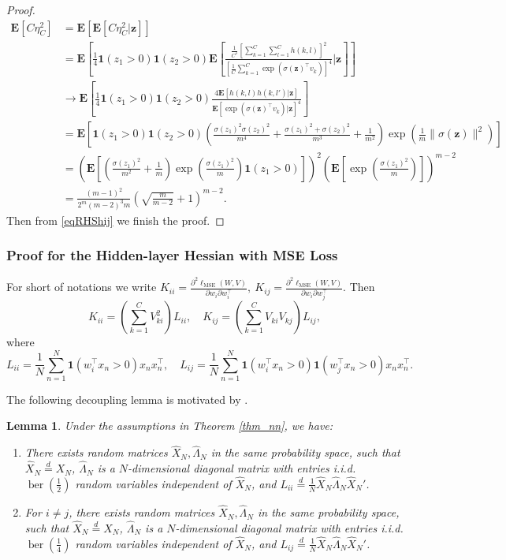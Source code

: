 \documentclass{article}
\newcommand{\E}{\mathbf{E}}
\newcommand\mf{\mathbf}
\newcommand{\rw}{\rightarrow}
\newcommand{\1}{^{(1)}}
\newcommand{\2}{^{(2)}}
\renewcommand{\l}{\left}
\renewcommand{\r}{\right}
\newtheorem{lem}{Lemma}
\newcommand{\bea}{\begin{equation}\begin{aligned}}
\newcommand{\eea}{\end{aligned}\end{equation}}
\begin{document}
\begin{proof}
\bea
\E[C\eta_C^2]&=\E[\E[C\eta_C^2|\mf{z}]]\\
&=\E\l[\frac{1}{4}\mf{1}(z_1>0)\mf{1}(z_2>0)\E\l[\frac{\frac{1}{C^3}\l[\sum_{k=1}^C\sum_{l=1}^C h(k,l)\r]^2}{\l[\frac{1}{C}\sum_{k=1}^C \exp(\sigma(\mf{z})^\top v_k)\r]^4}\bigg|\mf{z}\r]\r]\\
&\rw \E\l[\frac{1}{4}\mf{1}(z_1>0)\mf{1}(z_2>0)\frac{4\E\l[ h(k,l)h(k,l')\bigg|\mf{z}\r]}{\E\l[ \exp(\sigma(\mf{z})^\top v_k)\bigg|\mf{z}\r]^4}\r]\\
&=\E\l[\mf{1}(z_1>0)\mf{1}(z_2>0)\l(\frac{\sigma(z_1)^2\sigma(z_2)^2}{m^4}+\frac{\sigma(z_1)^2+\sigma(z_2)^2}{m^3}+\frac{1}{m^2}\r)\exp\l(\frac{1}{m}\|\sigma(\mf{z})\|^2\r)\r]\\
&=\l(\E\l[\l(\frac{\sigma(z_1)^2}{m^2}+\frac{1}{m}\r)\exp\l(\frac{\sigma(z_1)^2}{m}\r)\mf{1}(z_1>0)\r]\r)^2 \l(\E\l[\exp\l(\frac{\sigma(z_1)^2}{m}\r)\r]\r)^{m-2}\\
&=\frac{(m-1)^2}{2^m(m-2)^3m}\l(\sqrt{\frac{m}{m-2}}+1\r)^{m-2}.
\eea
Then from \eqref{eqRHShij} we finish the proof.
\end{proof}

\subsubsection{Proof for the Hidden-layer Hessian with MSE Loss}
\label{appendix_hidden_weights_mse}


For short of notations we write
$K_{ii}=\frac{\partial^2\ell_{\text{MSE}}(W,V)}{\partial w_i  \partial w_i^\top},\ K_{ij}=\frac{\partial^2\ell_{\text{MSE}}(W,V)}{\partial w_i  \partial w_j^\top}$. Then
$$
K_{ii}=\l(\sum_{k=1}^C V_{ki}^2\r)L_{ii},\quad
K_{ij}=\l(\sum_{k=1}^C V_{ki}V_{kj}\r)L_{ij},
$$
where
$$
L_{ii}=\frac{1}{N}\sum_{n=1}^N \mf{1}(w_i^\top x_n>0)x_nx_n^\top,\quad L_{ij}=\frac{1}{N}\sum_{n=1}^N \mf{1}(w_i^\top x_n>0)\mf{1}(w_j^\top x_n>0) x_nx_n^\top.
$$

The following decoupling lemma is motivated by \citep{hanin2020products}.

\begin{lem}\label{decouplingHanin}
Under the assumptions in Theorem \ref{thm_nn}, we have:

\begin{enumerate}
    \item There exists random matrices $\hat{X}_N,\hat{\Lambda}_N$ in the same probability space, such that $\hat{X}_N\stackrel{d}{=}X_N$, $\hat{\Lambda}_N$ is a $N$-dimensional diagonal matrix with entries i.i.d. $\operatorname{ber}(\frac{1}{2})$ random variables independent of $\hat{X}_N$, and $L_{ii}\stackrel{d}{=}\frac{1}{N}\hat{X}_N\hat{\Lambda}_N\hat{X}_N'$.
    \item For $i\ne j$, there exists random matrices $\hat{X}_N,\hat{\Lambda}_N$ in the same probability space, such that $\hat{X}_N\stackrel{d}{=}X_N$, $\hat{\Lambda}_N$ is a $N$-dimensional diagonal matrix with entries i.i.d. $\operatorname{ber}(\frac{1}{4})$ random variables independent of $\hat{X}_N$, and $L_{ij}\stackrel{d}{=}\frac{1}{N}\hat{X}_N\hat{\Lambda}_N\hat{X}_N'$.
\end{enumerate}
\end{lem}
\end{document}
